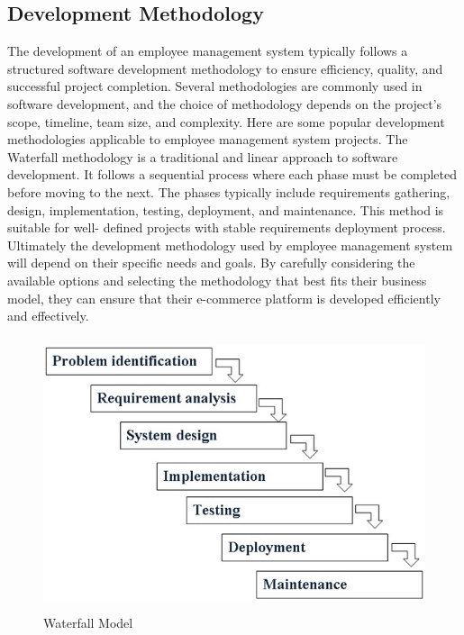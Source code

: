\subsection{Development Methodology}
The development of an employee management system typically follows a structured software
development methodology to ensure efficiency, quality, and successful project completion.
Several methodologies are commonly used in software development, and the choice of
methodology depends on the project's scope, timeline, team size, and complexity. Here are
some popular development methodologies applicable to employee management system
projects. The Waterfall methodology is a traditional and linear approach to software
development. It follows a sequential process where each phase must be completed before
moving to the next. The phases typically include requirements gathering, design,
implementation, testing, deployment, and maintenance. This method is suitable for well-
defined projects with stable requirements deployment process. Ultimately the development
methodology used by employee management system will depend on their specific needs and
goals. By carefully considering the available options and selecting the methodology that best
fits their business model, they can ensure that their e-commerce platform is developed
efficiently and effectively.
\vspace{4.5mm}
\begin{figure}[h]
    \centering
    \includegraphics[height=8cm]{img/waterfall-method.jpg}
    \caption{Waterfall Model}
    \label{fig:waterfallmodel}
\end{figure}
\newpage
